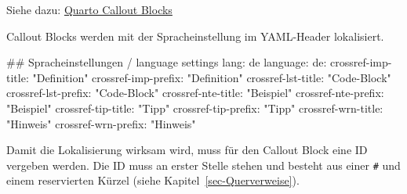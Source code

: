 \documentclass[
  letterpaper,
  DIV=11]{scrartcl}
\newenvironment{Shaded}{\begin{snugshade}}{\end{snugshade}}
\newcommand{\NormalTok}[1]{\textcolor[rgb]{0.00,0.23,0.31}{#1}}
\begin{document}
Siehe dazu:
\href{https://quarto.org/docs/authoring/callouts.html}{Quarto Callout
Blocks}

Callout Blocks werden mit der Spracheinstellung im YAML-Header
lokalisiert.

\begin{Shaded}
\begin{Highlighting}[]
\NormalTok{\#\# Spracheinstellungen / language settings}
\NormalTok{lang: de}
\NormalTok{language:}
\NormalTok{  de:}
\NormalTok{    crossref{-}imp{-}title: "Definition"}
\NormalTok{    crossref{-}imp{-}prefix: "Definition"}
\NormalTok{    crossref{-}lst{-}title: "Code{-}Block"}
\NormalTok{    crossref{-}lst{-}prefix: "Code{-}Block"}
\NormalTok{    crossref{-}nte{-}title: "Beispiel"}
\NormalTok{    crossref{-}nte{-}prefix: "Beispiel"}
\NormalTok{    crossref{-}tip{-}title: "Tipp"}
\NormalTok{    crossref{-}tip{-}prefix: "Tipp"}
\NormalTok{    crossref{-}wrn{-}title: "Hinweis"}
\NormalTok{    crossref{-}wrn{-}prefix: "Hinweis"}
\end{Highlighting}
\end{Shaded}

Damit die Lokalisierung wirksam wird, muss für den Callout Block eine ID
vergeben werden. Die ID muss an erster Stelle stehen und besteht aus
einer \texttt{\#} und einem reservierten Kürzel (siehe
Kapitel~\ref{sec-Querverweise}).
\end{document}
